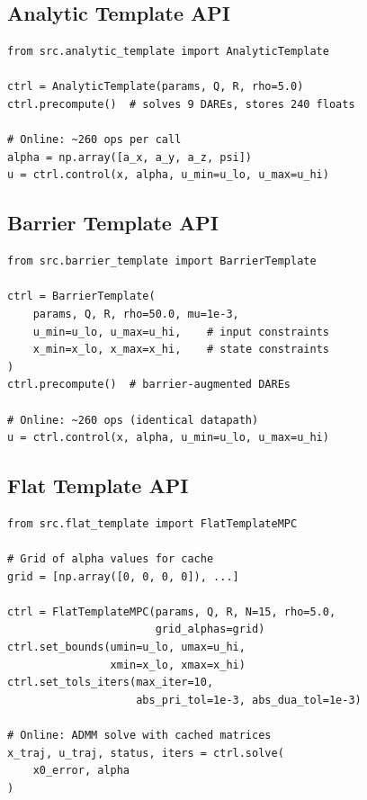 \documentclass[11pt]{article}
\begin{document}
\subsection{Analytic Template API}

\begin{lstlisting}[caption={analytic\_template.py}]
from src.analytic_template import AnalyticTemplate

ctrl = AnalyticTemplate(params, Q, R, rho=5.0)
ctrl.precompute()  # solves 9 DAREs, stores 240 floats

# Online: ~260 ops per call
alpha = np.array([a_x, a_y, a_z, psi])
u = ctrl.control(x, alpha, u_min=u_lo, u_max=u_hi)
\end{lstlisting}

\subsection{Barrier Template API}

\begin{lstlisting}[caption={barrier\_template.py}]
from src.barrier_template import BarrierTemplate

ctrl = BarrierTemplate(
    params, Q, R, rho=50.0, mu=1e-3,
    u_min=u_lo, u_max=u_hi,    # input constraints
    x_min=x_lo, x_max=x_hi,    # state constraints
)
ctrl.precompute()  # barrier-augmented DAREs

# Online: ~260 ops (identical datapath)
u = ctrl.control(x, alpha, u_min=u_lo, u_max=u_hi)
\end{lstlisting}

\subsection{Flat Template API}

\begin{lstlisting}[caption={flat\_template.py}]
from src.flat_template import FlatTemplateMPC

# Grid of alpha values for cache
grid = [np.array([0, 0, 0, 0]), ...]

ctrl = FlatTemplateMPC(params, Q, R, N=15, rho=5.0,
                       grid_alphas=grid)
ctrl.set_bounds(umin=u_lo, umax=u_hi,
                xmin=x_lo, xmax=x_hi)
ctrl.set_tols_iters(max_iter=10,
                    abs_pri_tol=1e-3, abs_dua_tol=1e-3)

# Online: ADMM solve with cached matrices
x_traj, u_traj, status, iters = ctrl.solve(
    x0_error, alpha
)
\end{lstlisting}
\end{document}
